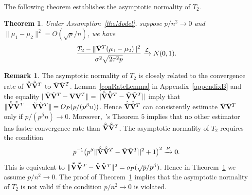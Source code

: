 \documentclass[review]{elsarticle}
\theoremstyle{plain}
\newtheorem{theorem}{\quad\quad Theorem}
\theoremstyle{definition}
\newtheorem{remark}{\quad\quad Remark}
\theoremstyle{remark}
\begin{document}
The following theorem establishes the asymptotic normality of $T_2$.
\begin{theorem}\label{myPanpan}
    Under Assumption~\ref{theModel},
suppose $p/n^2\to 0$ and
    $\|\mu_1-\mu_2\|^2=O({\sqrt{p}}/{n})$,
    we have
\begin{equation*}
        \frac{T_2-\|\tilde{\mathbf{V}}^T(\mu_1-\mu_2)\|^2}{\sigma^2\sqrt{2\tau^2 p}}\xrightarrow{\mathcal{L}}N(0,1).
\end{equation*}
\end{theorem} 
\begin{remark}
The asymptotic normality of $T_2$ is closely related to the convergence rate of $\hat{\tilde{\mathbf{V}}}\hat{\tilde{\mathbf{V}}}^T$ to $\tilde{\mathbf{V}}\tilde{\mathbf{V}}^T$.
    Lemma~\ref{conRateLemma} in Appendix~\ref{appendixB} and the equality $\|\hat{\mathbf{V}}\hat{\mathbf{V}}^T -\mathbf{V} \mathbf{V}^T\|=\|\hat{\tilde{\mathbf{V}}}\hat{\tilde{\mathbf{V}}}^T -\tilde{\mathbf{V}} \tilde{\mathbf{V}}^T\|$ imply that 
    $\|\hat{\tilde{\mathbf{V}}}\hat{\tilde{\mathbf{V}}}^T -\tilde{\mathbf{V}} \tilde{\mathbf{V}}^T\|=O_P(p/(p^{\beta}n))$.
    Hence $\hat{\tilde{\mathbf{V}}}\hat{\tilde{\mathbf{V}}}^T$ can consistently estimate $\tilde{\mathbf{V}}\tilde{\mathbf{V}}^T$ only if $p/(p^{\beta}n)\to 0$.
    Moreover,~\cite{Cai2012Sparse}'s Theorem $5$ implies that no other estimator has faster convergence rate than $\hat{\tilde{\mathbf{V}}}\hat{\tilde{\mathbf{V}}}^T$.
    The asymptotic normality of $T_2$ requires the condition
    $$
    p^{-1}\big(p^{\beta}\|\hat{\tilde{\mathbf{V}}}\hat{\tilde{\mathbf{V}}}^T -\tilde{\mathbf{V}} \tilde{\mathbf{V}}^T\|^2+1\big)^2\xrightarrow{P} 0.
    $$
    This is equivalent to $\|\hat{\tilde{\mathbf{V}}}\hat{\tilde{\mathbf{V}}}^T -\tilde{\mathbf{V}} \tilde{\mathbf{V}}^T\|^2=o_P(\sqrt{p}/p^{\beta})$.
    Hence in Theorem~\ref{myPanpan} we assume $p/n^2\to 0$.
The proof of Theorem~\ref{myPanpan} implies that the asymptotic normality of $T_2$ is not valid if the condition $p/n^2\to 0$ is violated.
\end{remark}
\end{document}
